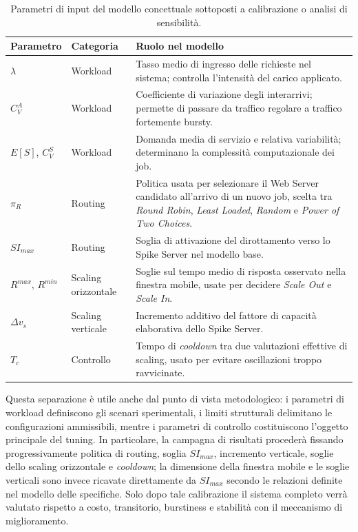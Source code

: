 ﻿\documentclass[a4paper,12pt]{article}
\begin{document}
\begin{table}[t]
    \centering
    \small
    \renewcommand{\arraystretch}{1.25}
    \begin{tabular}{llp{8.2cm}}
        \hline
        \textbf{Parametro} & \textbf{Categoria} & \textbf{Ruolo nel modello} \\ \hline
        $\lambda$ & Workload & Tasso medio di ingresso delle richieste nel sistema; controlla l'intensità del carico applicato. \\
        $C_V^A$ & Workload & Coefficiente di variazione degli interarrivi; permette di passare da traffico regolare a traffico fortemente bursty. \\
        $E[S]$, $C_V^S$ & Workload & Domanda media di servizio e relativa variabilità; determinano la complessità computazionale dei job. \\
        $\pi_R$ & Routing & Politica usata per selezionare il Web Server candidato all'arrivo di un nuovo job, scelta tra \textit{Round Robin}, \textit{Least Loaded}, \textit{Random} e \textit{Power of Two Choices}. \\
        $SI_{max}$ & Routing & Soglia di attivazione del dirottamento verso lo Spike Server nel modello base. \\
        $R^{max}$, $R^{min}$ & Scaling orizzontale & Soglie sul tempo medio di risposta osservato nella finestra mobile, usate per decidere \textit{Scale Out} e \textit{Scale In}. \\
        $\Delta v_s$ & Scaling verticale & Incremento additivo del fattore di capacità elaborativa dello Spike Server. \\
        $T_c$ & Controllo & Tempo di \textit{cooldown} tra due valutazioni effettive di scaling, usato per evitare oscillazioni troppo ravvicinate. \\ \hline
    \end{tabular}
    \caption{Parametri di input del modello concettuale sottoposti a calibrazione o analisi di sensibilità.}
    \label{tab:conceptual_tuning_parameters}
\end{table}

Questa separazione è utile anche dal punto di vista metodologico: i parametri di workload definiscono gli scenari sperimentali, i limiti strutturali delimitano le configurazioni ammissibili, mentre i parametri di controllo costituiscono l'oggetto principale del tuning. In particolare, la campagna di risultati procederà fissando progressivamente politica di routing, soglia $SI_{max}$, incremento verticale, soglie dello scaling orizzontale e \textit{cooldown}; la dimensione della finestra mobile e le soglie verticali sono invece ricavate direttamente da $SI_{max}$ secondo le relazioni definite nel modello delle specifiche. Solo dopo tale calibrazione il sistema completo verrà valutato rispetto a costo, transitorio, burstiness e stabilità con il meccanismo di miglioramento.
\end{document}
